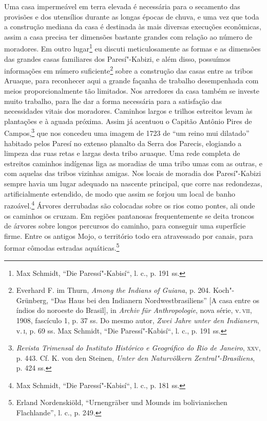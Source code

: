 Uma casa impermeável em terra elevada é necessária para o secamento das
provisões e dos utensílios durante as longas épocas de chuva, e uma vez
que toda a construção mediana da casa é destinada às mais diversas
execuções econômicas, assim a casa precisa ter dimensões bastante
grandes com relação ao número de moradores. Em outro lugar\footnote{Max
  Schmidt, ``Die Paressí"-Kabisí``, l. c., p. 191 ss.} eu discuti
meticulosamente as formas e as dimensões das grandes casas familiares
dos Paresí"-Kabizi, e além disso, possuímos informações em número
suficiente\footnote{Everhard F. im Thurn, \emph{Among the Indians of
  Guiana}, p. 204. Koch"-Grünberg, ``Das Haus bei den Indianern
  Nordwestbrasiliens'' {[}A casa entre os índios do noroeste do
  Brasil{]}, in \emph{Archiv für Anthropologie}, nova série, v.\,\textsc{vii},
  1908, fascículo 1, p. 37 ss. Do mesmo autor, \emph{Zwei Jahre unter
  den Indianern}, v.\,\textsc{i}, p. 69 ss. Max Schmidt, ``Die Paressí"-Kabisí``,
  l. c., p. 191 ss.} sobre a construção das casas entre as tribos
Aruaque, para reconhecer aqui a grande façanha de trabalho desempenhada
com meios proporcionalmente tão limitados. Nos arredores da casa também
se investe muito trabalho, para lhe dar a forma necessária para a
satisfação das necessidades vitais dos moradores. Caminhos largos e
trilhos estreitos levam às plantações e à aguada próxima. Assim já
acentuou o Capitão Antônio Pires de Campos,\footnote{\emph{Revista
  Trimensal do Instituto Histórico e Geográfico do Rio de Janeiro}, \textsc{xxv},
  p. 443. Cf. K. von den Steinen, \emph{Unter den Naturvölkern
  Zentral"-Brasiliens}, p. 424 ss.} que nos concedeu uma imagem de 1723
de ``um reino mui dilatado'' habitado pelos Paresí no extenso planalto
da Serra dos Parecis, elogiando a limpeza das ruas retas e largas desta
tribo aruaque. Uma rede completa de estreitos caminhos indígenas liga as
moradias de uma tribo umas com as outras, e com aquelas das tribos
vizinhas amigas. Nos locais de moradia dos Paresí"-Kabizi sempre havia um
lugar adequado na nascente principal, que corre nas redondezas,
artificialmente estendido, de modo que assim se forjou um local de banho
razoável.\footnote{Max Schmidt, ``Die Paressí"-Kabisí``, l. c., p. 181 ss.}
Árvores derrubadas são colocadas sobre os rios como pontes, ali onde os
caminhos os cruzam. Em regiões pantanosas frequentemente se deita
troncos de árvores sobre longos percursos do caminho, para conseguir uma
superfície firme. Entre os antigos Mojo, o território todo era
atravessado por canais, para formar cômodas estradas aquáticas.\footnote{Erland
  Nordenskiöld, ``Urnengräber und Mounds im bolivianischen Flachlande'',
  l. c., p. 249.}

